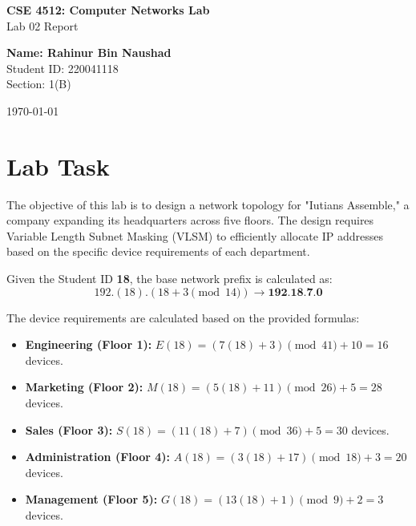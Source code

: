 \documentclass[a4paper,12pt]{article}
\begin{document}
\begin{titlepage}
    \centering
    \vspace*{\fill} %
    
    {\Huge \textbf{CSE 4512: Computer Networks Lab}\\ Lab 02 Report \par}
    
    \vspace{1.5cm} %
    
    {\Large
        \textbf{Name: Rahinur Bin Naushad} \\
        Student ID: 220041118 \\
        Section: 1(B) \par
    }
    
    \vspace*{\fill} %
    
    {\Large \today \par}
\end{titlepage}

\section{Lab Task}
The objective of this lab is to design a network topology for "Iutians Assemble," a company expanding its headquarters across five floors. The design requires Variable Length Subnet Masking (VLSM) to efficiently allocate IP addresses based on the specific device requirements of each department.

Given the Student ID \textbf{18}, the base network prefix is calculated as:
\[ 192.(18).(18+3 \pmod{14}) \rightarrow \textbf{192.18.7.0} \]

The device requirements are calculated based on the provided formulas:
\begin{itemize}
    \item \textbf{Engineering (Floor 1):} $E(18) = (7(18) + 3) \pmod{41} + 10 = 16$ devices.
    \item \textbf{Marketing (Floor 2):} $M(18) = (5(18) + 11) \pmod{26} + 5 = 28$ devices.
    \item \textbf{Sales (Floor 3):} $S(18) = (11(18) + 7) \pmod{36} + 5 = 30$ devices.
    \item \textbf{Administration (Floor 4):} $A(18) = (3(18) + 17) \pmod{18} + 3 = 20$ devices.
    \item \textbf{Management (Floor 5):} $G(18) = (13(18) + 1) \pmod{9} + 2 = 3$ devices.
\end{itemize}
\end{document}
